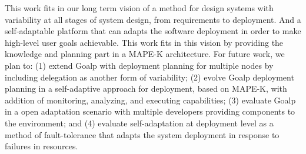 This work fits in our long term vision of a method for design systems with variability at all stages of system design, from requirements to deployment. And a self-adaptable platform that can adapts the software deployment in order to make high-level user goals achievable. This work fits in this vision by providing the knowledge and planning part in a MAPE-K\cite{kephart_vision_2003} architecture.
For future work, we plan to: (1) extend Goalp with deployment planning for multiple nodes by including delegation as another form of variability;  (2) evolve Goalp deployment planning in a self-adaptive approach for deployment, based on MAPE-K, with addition of monitoring, analyzing, and executing capabilities; (3) evaluate Goalp in a open adaptation scenario with multiple developers providing components to the environment; and (4) evaluate self-adaptation at deployment level as a method of fault-tolerance that adapts the system deployment in response to failures in resources.

